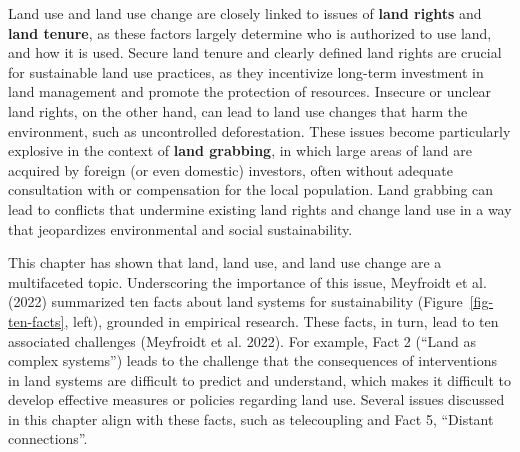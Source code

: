 \documentclass[
  a4paper,
  DIV=11,
  numbers=noendperiod,
  oneside,
  openany]{scrreprt}
\begin{document}
\begin{tcolorbox}[enhanced jigsaw, arc=.35mm, bottomrule=.15mm, bottomtitle=1mm, breakable, colback=white, colbacktitle=quarto-callout-note-color!10!white, colframe=quarto-callout-note-color-frame, coltitle=black, left=2mm, leftrule=.75mm, opacityback=0, opacitybacktitle=0.6, rightrule=.15mm, title={Land rights and land tenure}, titlerule=0mm, toprule=.15mm, toptitle=1mm]

Land use and land use change are closely linked to issues of
\textbf{land rights} and \textbf{land tenure}, as these factors largely
determine who is authorized to use land, and how it is used. Secure land
tenure and clearly defined land rights are crucial for sustainable land
use practices, as they incentivize long-term investment in land
management and promote the protection of resources. Insecure or unclear
land rights, on the other hand, can lead to land use changes that harm
the environment, such as uncontrolled deforestation. These issues become
particularly explosive in the context of \textbf{land grabbing}, in
which large areas of land are acquired by foreign (or even domestic)
investors, often without adequate consultation with or compensation for
the local population. Land grabbing can lead to conflicts that undermine
existing land rights and change land use in a way that jeopardizes
environmental and social sustainability.

\end{tcolorbox}

This chapter has shown that land, land use, and land use change are a
multifaceted topic. Underscoring the importance of this issue,
{Meyfroidt et al.} (2022) summarized ten facts about land systems for
sustainability (Figure~\ref{fig-ten-facts}, left), grounded in empirical
research. These facts, in turn, lead to ten associated challenges
({Meyfroidt et al.} 2022). For example, Fact 2 (``Land as complex
systems'') leads to the challenge that the consequences of interventions
in land systems are difficult to predict and understand, which makes it
difficult to develop effective measures or policies regarding land use.
Several issues discussed in this chapter align with these facts, such as
telecoupling and Fact 5, ``Distant connections''.
\end{document}
